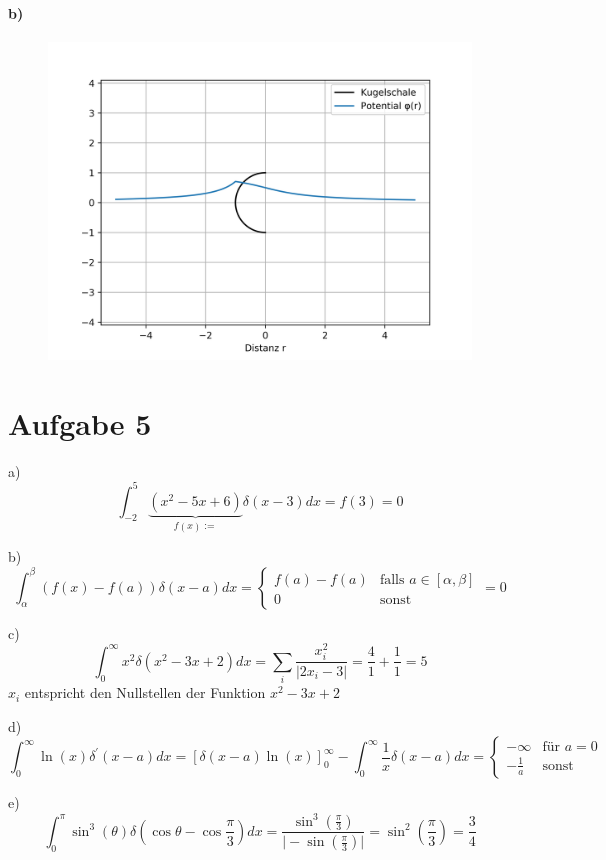 \documentclass{article}
\begin{document}
\paragraph{b)}
\mbox{}
\begin{figure}[H]
	\centering
	\includegraphics[width=15cm]{aufgabe4plot.png}
\end{figure}



\newpage
\section*{Aufgabe 5}
\par{a)}
\[
	\int_{-2}^5 \underbrace{(x^2 - 5x + 6)}_{f(x) :=}
	\delta(x-3) dx
	= f(3) = 0
\]
\vspace{0.5cm}
\par{b)}
\[
	\int_\alpha^\beta
	(f(x) - f(a)) \delta(x - a) dx = 
	\begin{cases}
		f(a) - f(a)
		&\text{falls } a \in [\alpha, \beta] \\
		0
		&\text{sonst}
	\end{cases}
	= 0
	\]
\vspace{0.5cm}
\par{c)}
\[
	\int_0^\infty x^2 \delta(x^2 -3x + 2) dx
	=
	\sum_i \frac{x_i^2}{\vert 2x_i - 3 \vert} = \frac41 + \frac11 = 5
\]
$x_i$ entspricht den Nullstellen der Funktion $x^2 - 3x + 2$
\vspace{0.5cm}
\par{d)}
\[
	\int_0^\infty \ln(x) \delta^\prime(x-a) dx
	=
	\left[
		\delta(x-a) \ln(x)
	\right]_{0}^\infty
	-
	\int_0^\infty \frac1x \delta(x-a) dx
	=
	\begin{cases}
		-\infty &\text{für } a = 0\\
		-\frac1a &\text{sonst}
	\end{cases}
\]	
\vspace{0.5cm}
\par{e)}
\[
	\int_0^\pi \sin^3(\theta) \delta \left( \cos\theta - \cos\frac\pi3
	\right) dx
	=
	\frac{\sin^3 \left( \frac\pi3 \right)}
	{\vert -\sin\left( \frac\pi3 \right) \vert}
	= 
	\sin^2 \left( \frac\pi3 \right)
	= \frac34
\]
\end{document}
